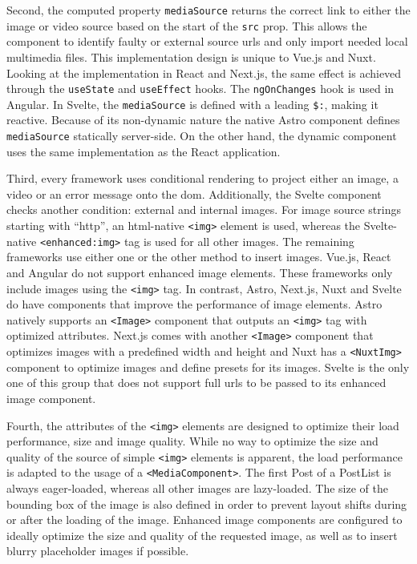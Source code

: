 \documentclass[a4paper, 12pt]{article}
\begin{document}
Second, the computed property \verb|mediaSource| returns the correct link to either the image or video source based on the start of the \verb|src| prop.
This allows the component to identify faulty or external source \acrshort{url}s and only import needed local multimedia files.
This implementation design is unique to Vue.js and Nuxt.
Looking at the implementation in React and Next.js, the same effect is achieved through the \verb|useState| and \verb|useEffect| hooks.
The \verb|ngOnChanges| hook is used in Angular.
In Svelte, the \verb|mediaSource| is defined with a leading \verb|$:|, making it reactive. Because of its non-dynamic nature the native Astro component defines \verb|mediaSource| statically server-side.
On the other hand, the dynamic component uses the same implementation as the React application.

Third, every framework uses conditional rendering to project either an image, a video or an error message onto the \acrshort{dom}.
Additionally, the Svelte component checks another condition: external and internal images.
For image source strings starting with \enquote{http}, an \acrshort{html}-native \verb|<img>| element is used, whereas the Svelte-native \verb|<enhanced:img>| tag is used for all other images.
The remaining frameworks use either one or the other method to insert images.
Vue.js, React and Angular do not support enhanced image elements.
These frameworks only include images using the \verb|<img>| tag.
In contrast, Astro, Next.js, Nuxt and Svelte do have components that improve the performance of image elements.
Astro natively supports an \verb|<Image>| component that outputs an \verb|<img>| tag with optimized attributes.
Next.js comes with another \verb|<Image>| component that optimizes images with a predefined width and height and Nuxt has a \verb|<NuxtImg>| component to optimize images and define presets for its images.
Svelte is the only one of this group that does not support full \acrshort{url}s to be passed to its enhanced image component.

Fourth, the attributes of the \verb|<img>| elements are designed to optimize their load performance, size and image quality.
While no way to optimize the size and quality of the source of simple \verb|<img>| elements is apparent, the load performance is adapted to the usage of a \verb|<MediaComponent>|.
The first Post of a PostList is always eager-loaded, whereas all other images are lazy-loaded.
The size of the bounding box of the image is also defined in order to prevent layout shifts during or after the loading of the image.
Enhanced image components are configured to ideally optimize the size and quality of the requested image, as well as to insert blurry placeholder images if possible.
\end{document}
